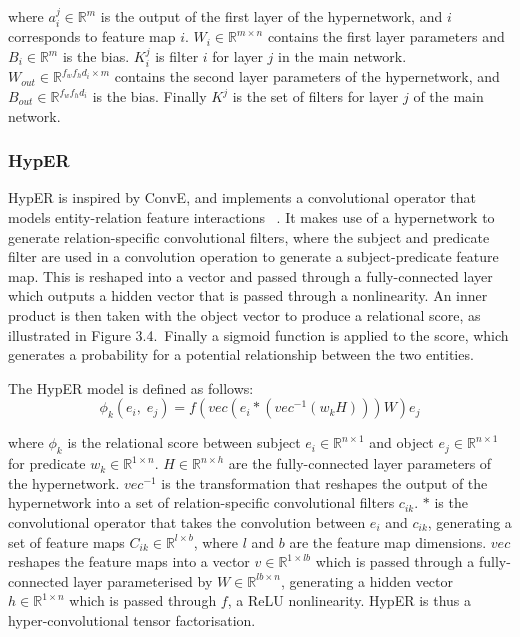 \noindent where $ a_i^j \in \mathbb{R}^{m} $ is the output of the first layer of the hypernetwork, and $ i $ corresponds to feature map $ i $. $ W_i \in \mathbb{R}^{m \times n} $ contains the first layer parameters and $ B_i \in \mathbb{R}^m $ is the bias. $ K_i^j $ is filter $ i $ for layer $ j $ in the main network. $ W_{out} \in \mathbb{R}^{f_w f_hd_i \times m} $ contains the second layer parameters of the hypernetwork, and $ B_{out} \in \mathbb{R}^{f_wf_hd_i} $ is the bias. Finally $ K^j $ is the set of filters for layer $ j $ of the main network. 

\subsubsection{HypER}

\noindent HypER is inspired by ConvE, and implements a convolutional operator that models entity-relation feature interactions \unskip ~\citep{balazevic2019hypernetwork}. It makes use of a hypernetwork to generate relation-specific convolutional filters, where the subject and predicate filter are used in a convolution operation to generate a subject-predicate feature map. This is reshaped into a vector and passed through a fully-connected layer which outputs a hidden vector that is passed through a nonlinearity. An inner product is then taken with the object vector to produce a relational score, as illustrated in Figure 3.4.\ Finally a sigmoid function is applied to the score, which generates a probability for a potential relationship between the two entities. \par

\noindent The HypER model is defined as follows: 
\begin{equation}
	\phi_k(e_i, \; e_j) = f(vec(e_i * (vec^{-1}(w_kH)))W)e_j
\end{equation}

\noindent where $ \phi_k $ is the relational score between subject $ e_i \in \mathbb{R}^{n \times 1} $ and object $ e_j \in \mathbb{R}^{n \times 1} $ for predicate $ w_k \in \mathbb{R}^{1 \times n} $. $ H \in \mathbb{R}^{n \times h} $ are the fully-connected layer parameters of the hypernetwork. $ vec^{-1} $ is the transformation that reshapes the output of the hypernetwork into a set of relation-specific convolutional filters $ c_{ik} $. $ * $ is the convolutional operator that takes the convolution between $ e_i $ and $ c_{ik} $, generating a set of feature maps $ C_{ik} \in \mathbb{R}^{l \times b} $, where $ l $ and $ b $ are the feature map dimensions. $ vec $ reshapes the feature maps into a vector $ v \in \mathbb{R}^{1 \times lb} $ which is passed through a fully-connected layer parameterised by $ W \in \mathbb{R}^{lb \times n} $, generating a hidden vector $ h \in \mathbb{R}^{1 \times n} $ which is passed through $ f $, a ReLU nonlinearity. HypER is thus a hyper-convolutional tensor factorisation. 

